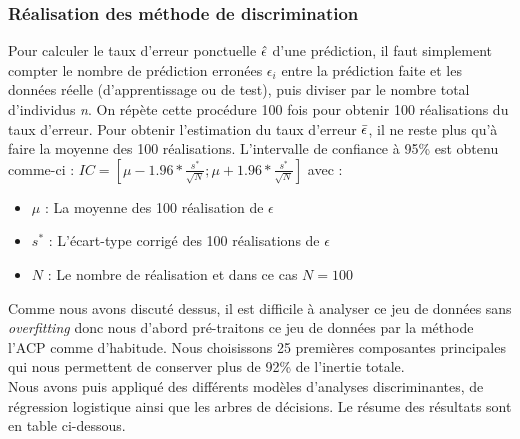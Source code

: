 \documentclass[a4paper,11pt,oneside,roman]{article}
\begin{document}
\subsubsection{Réalisation des méthode de discrimination}
Pour calculer le taux d'erreur ponctuelle $\Hat{\epsilon}$ d'une prédiction, il faut simplement compter le nombre de prédiction erronées $\epsilon_i$ entre la prédiction faite et les données réelle (d'apprentissage ou de test), puis diviser par le nombre total d'individus \textit{n}. \newline
On répète cette procédure 100 fois pour obtenir 100 réalisations du taux d'erreur. Pour obtenir l'estimation du taux d'erreur $\Bar{\epsilon}$, il ne reste plus qu'à faire la moyenne des 100 réalisations. \newline
L'intervalle de confiance à 95\% est obtenu comme-ci : $IC = \left[\mu - 1.96*\frac{s^{*}}{\sqrt{N}};\mu + 1.96*\frac{s^{*}}{\sqrt{N}} \right]$ avec : \newline
\begin{itemize}
    \item $\mu$ : La moyenne des 100 réalisation de $\epsilon$ \\
    \item $s^{*}$ : L'écart-type corrigé des 100 réalisations de $\epsilon$ \\
    \item $N$ : Le nombre de réalisation et dans ce cas $N=100$
\end{itemize}
Comme nous avons discuté dessus, il est difficile à analyser ce jeu de données sans \textit{overfitting} donc nous d'abord pré-traitons ce jeu de données par la méthode l'ACP comme d'habitude. Nous choisissons 25 premières composantes principales qui nous permettent de conserver plus de 92\% de l'inertie totale. \\
Nous avons puis appliqué des différents modèles d'analyses discriminantes, de régression logistique ainsi que les arbres de décisions. Le résume des résultats sont en table ci-dessous.
\end{document}
